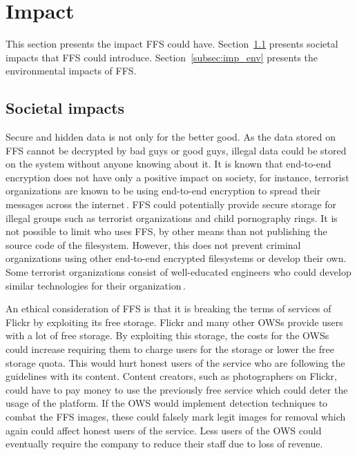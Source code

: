 \section{Impact}
\label{sec:imp}
This section presents the impact \gls{FFS} could have. Section~\ref{subsec:imp_soc} presents societal impacts that \gls{FFS} could introduce. Section~\ref{subsec:imp_env} presents the environmental impacts of \gls{FFS}.

\subsection{Societal impacts}
\label{subsec:imp_soc}
Secure and hidden data is not only for the better good. As the data stored on \gls{FFS} cannot be decrypted by bad guys or good guys, illegal data could be stored on the system without anyone knowing about it. It is known that \mbox{end-to-end} encryption does not have only a positive impact on society, for instance, terrorist organizations are known to be using end-to-end encryption to spread their messages across the internet\,\cite{ruddEncryptionCounterterrorismGetting2017}. \gls{FFS} could potentially provide secure storage for illegal groups such as terrorist organizations and child pornography rings. It is not possible to limit who uses \gls{FFS}, by other means than not publishing the source code of the filesystem. However, this does not prevent criminal organizations using other \mbox{end-to-end} encrypted filesystems or develop their own. Some terrorist organizations consist of \mbox{well-educated} engineers who could develop similar technologies for their organization\,\cite{berrebyEngineeringTerror2010}.

An ethical consideration of \gls{FFS} is that it is breaking the terms of services of Flickr by exploiting its free storage. Flickr and many other \gls{OWS}s provide users with a lot of free storage. By exploiting this storage, the costs for the \gls{OWS}s could increase requiring them to charge users for the storage or lower the free storage quota. This would hurt honest users of the service who are following the guidelines with its content. Content creators, such as photographers on Flickr, could have to pay money to use the previously free service which could deter the usage of the platform. If the \gls{OWS} would implement detection techniques to combat the \gls{FFS} images, these could falsely mark legit images for removal which again could affect honest users of the service. Less users of the \gls{OWS} could eventually require the company to reduce their staff due to loss of revenue. 

